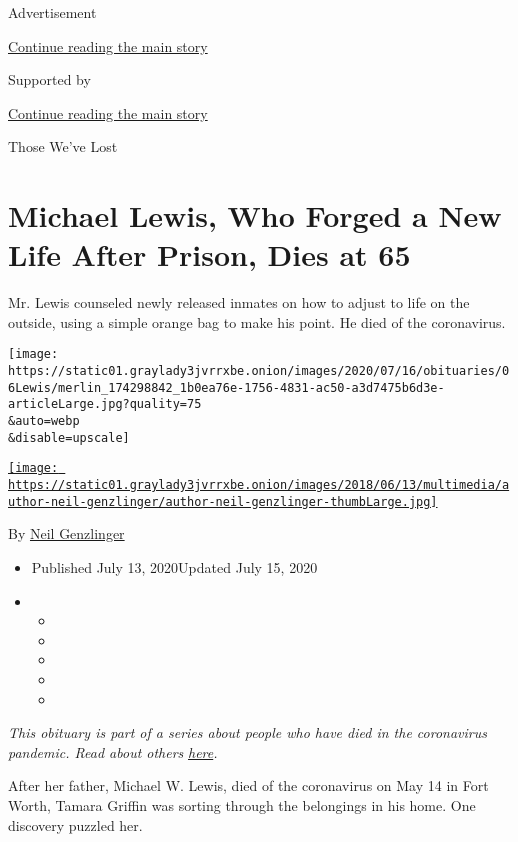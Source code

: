 Advertisement

\protect\hyperlink{after-top}{Continue reading the main story}

Supported by

\protect\hyperlink{after-sponsor}{Continue reading the main story}

Those We've Lost

\hypertarget{michael-lewis-who-forged-a-new-life-after-prison-dies-at-65}{%
\section{Michael Lewis, Who Forged a New Life After Prison, Dies at
65}\label{michael-lewis-who-forged-a-new-life-after-prison-dies-at-65}}

Mr. Lewis counseled newly released inmates on how to adjust to life on
the outside, using a simple orange bag to make his point. He died of the
coronavirus.

\texttt{[image: https://static01.graylady3jvrrxbe.onion/images/2020/07/16/obituaries/06Lewis/merlin\_174298842\_1b0ea76e-1756-4831-ac50-a3d7475b6d3e-articleLarge.jpg?quality=75\\\&auto=webp\\\&disable=upscale]}

\href{https://www.nytimes3xbfgragh.onion/by/neil-genzlinger}{\texttt{[image: https://static01.graylady3jvrrxbe.onion/images/2018/06/13/multimedia/author-neil-genzlinger/author-neil-genzlinger-thumbLarge.jpg]}}

By \href{https://www.nytimes3xbfgragh.onion/by/neil-genzlinger}{Neil
Genzlinger}

\begin{itemize}
\item
  Published July 13, 2020Updated July 15, 2020
\item
  \begin{itemize}
  \item
  \item
  \item
  \item
  \item
  \end{itemize}
\end{itemize}

\emph{This obituary is part of a series about people who have died in
the coronavirus pandemic. Read about others}
\href{https://www.nytimes3xbfgragh.onion/interactive/2020/obituaries/people-died-coronavirus-obituaries.html}{\emph{here}}\emph{.}

After her father, Michael W. Lewis, died of the coronavirus on May 14 in
Fort Worth, Tamara Griffin was sorting through the belongings in his
home. One discovery puzzled her.

